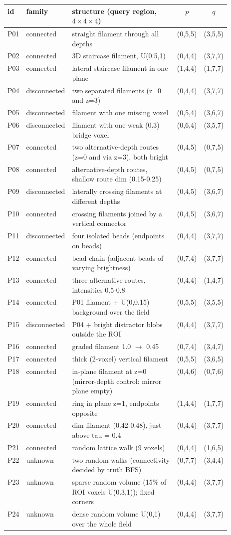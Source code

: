 \begin{tabular}{@{}llp{0.52\linewidth}cc@{}}\toprule
id & family & structure (query region, $4\times4\times4$) & $p$ & $q$\\\midrule
P01 & connected & straight filament through all depths & (0,5,5) & (3,5,5)\\
P02 & connected & 3D staircase filament, U(0.5,1) & (0,4,4) & (3,7,7)\\
P03 & connected & lateral staircase filament in one plane & (1,4,4) & (1,7,7)\\
P04 & disconnected & two separated filaments (z=0 and z=3) & (0,4,4) & (3,7,7)\\
P05 & disconnected & filament with one missing voxel & (0,5,4) & (3,6,7)\\
P06 & disconnected & filament with one weak (0.3) bridge voxel & (0,6,4) & (3,5,7)\\
P07 & connected & two alternative-depth routes (z=0 and via z=3), both bright & (0,4,5) & (0,7,5)\\
P08 & connected & alternative-depth routes, shallow route dim (0.15-0.25) & (0,4,5) & (0,7,5)\\
P09 & disconnected & laterally crossing filaments at different depths & (0,4,5) & (3,6,7)\\
P10 & connected & crossing filaments joined by a vertical connector & (0,4,5) & (3,6,7)\\
P11 & disconnected & four isolated beads (endpoints on beads) & (0,4,4) & (3,7,7)\\
P12 & connected & bead chain (adjacent beads of varying brightness) & (0,7,4) & (3,7,7)\\
P13 & connected & three alternative routes, intensities 0.5-0.8 & (0,4,4) & (1,4,7)\\
P14 & connected & P01 filament + U(0,0.15) background over the field & (0,5,5) & (3,5,5)\\
P15 & disconnected & P04 + bright distractor blobs outside the ROI & (0,4,4) & (3,7,7)\\
P16 & connected & graded filament 1.0 $\to$ 0.45 & (0,7,4) & (3,4,7)\\
P17 & connected & thick (2-voxel) vertical filament & (0,5,5) & (3,6,5)\\
P18 & connected & in-plane filament at z=0 (mirror-depth control: mirror plane empty) & (0,4,6) & (0,7,6)\\
P19 & connected & ring in plane z=1, endpoints opposite & (1,4,4) & (1,7,7)\\
P20 & connected & dim filament (0.42-0.48), just above tau = 0.4 & (0,4,4) & (3,7,7)\\
P21 & connected & random lattice walk (9 voxels) & (0,4,4) & (1,6,5)\\
P22 & unknown & two random walks (connectivity decided by truth BFS) & (0,7,7) & (3,4,4)\\
P23 & unknown & sparse random volume (15\% of ROI voxels U(0.3,1)); fixed corners & (0,4,4) & (3,7,7)\\
P24 & unknown & dense random volume U(0,1) over the whole field & (0,4,4) & (3,7,7)\\
\bottomrule\end{tabular}
